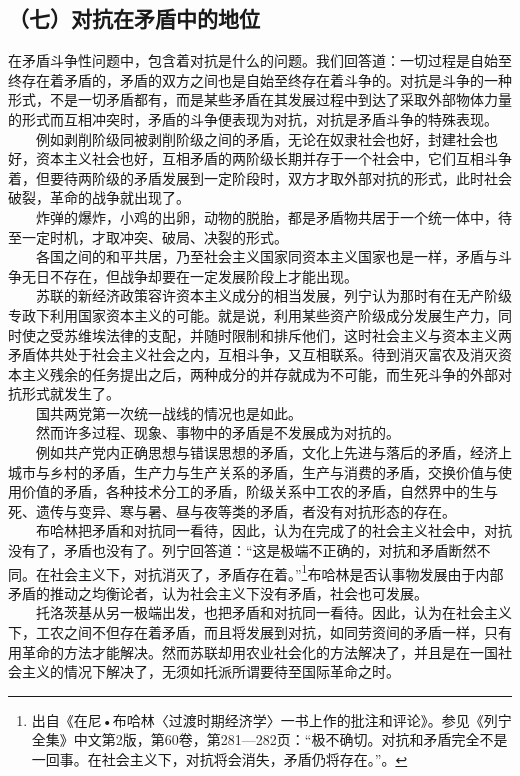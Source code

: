 \documentclass[cn,11pt,chinese]{elegantbook}
\def\myformat#1{\hfil\hfil #1}
\begin{document}
\subsection*{\myformat{（七）对抗在矛盾中的地位}}
在矛盾斗争性问题中，包含着对抗是什么的问题。我们回答道：一切过程是自始至终存在着矛盾的，矛盾的双方之间也是自始至终存在着斗争的。对抗是斗争的一种形式，不是一切矛盾都有，而是某些矛盾在其发展过程中到达了采取外部物体力量的形式而互相冲突时，矛盾的斗争便表现为对抗，对抗是矛盾斗争的特殊表现。\\
　　例如剥削阶级同被剥削阶级之间的矛盾，无论在奴隶社会也好，封建社会也好，资本主义社会也好，互相矛盾的两阶级长期并存于一个社会中，它们互相斗争着，但要待两阶级的矛盾发展到一定阶段时，双方才取外部对抗的形式，此时社会破裂，革命的战争就出现了。\\
　　炸弹的爆炸，小鸡的出卵，动物的脱胎，都是矛盾物共居于一个统一体中，待至一定时机，才取冲突、破局、决裂的形式。\\
　　各国之间的和平共居，乃至社会主义国家同资本主义国家也是一样，矛盾与斗争无日不存在，但战争却要在一定发展阶段上才能出现。\\
　　苏联的新经济政策容许资本主义成分的相当发展，列宁认为那时有在无产阶级专政下利用国家资本主义的可能。就是说，利用某些资产阶级成分发展生产力，同时使之受苏维埃法律的支配，并随时限制和排斥他们，这时社会主义与资本主义两矛盾体共处于社会主义社会之内，互相斗争，又互相联系。待到消灭富农及消灭资本主义残余的任务提出之后，两种成分的并存就成为不可能，而生死斗争的外部对抗形式就发生了。\\
　　国共两党第一次统一战线的情况也是如此。\\
　　然而许多过程、现象、事物中的矛盾是不发展成为对抗的。\\
　　例如共产党内正确思想与错误思想的矛盾，文化上先进与落后的矛盾，经济上城市与乡村的矛盾，生产力与生产关系的矛盾，生产与消费的矛盾，交换价值与使用价值的矛盾，各种技术分工的矛盾，阶级关系中工农的矛盾，自然界中的生与死、遗传与变异、寒与暑、昼与夜等类的矛盾，者没有对抗形态的存在。\\
　　布哈林把矛盾和对抗同一看待，因此，认为在完成了的社会主义社会中，对抗没有了，矛盾也没有了。列宁回答道：“这是极端不正确的，对抗和矛盾断然不同。在社会主义下，对抗消灭了，矛盾存在着。”\footnote[15]{ 出自《在尼•布哈林〈过渡时期经济学〉一书上作的批注和评论》。参见《列宁全集》中文第2版，第60卷，第281—282页：“极不确切。对抗和矛盾完全不是一回事。在社会主义下，对抗将会消失，矛盾仍将存在。”。}布哈林是否认事物发展由于内部矛盾的推动之均衡论者，认为社会主义下没有矛盾，社会也可发展。\\
　　托洛茨基从另一极端出发，也把矛盾和对抗同一看待。因此，认为在社会主义下，工农之间不但存在着矛盾，而且将发展到对抗，如同劳资间的矛盾一样，只有用革命的方法才能解决。然而苏联却用农业社会化的方法解决了，并且是在一国社会主义的情况下解决了，无须如托派所谓要待至国际革命之时。\\
\end{document}
